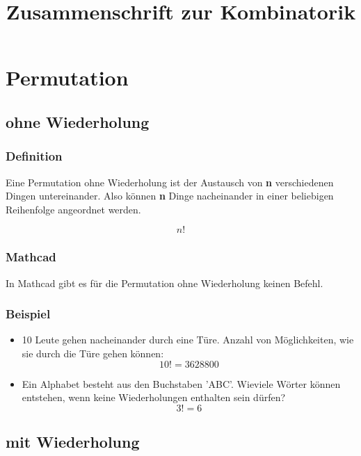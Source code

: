 \documentclass[a4paper,10pt]{article}
\title{Zusammenschrift zur Kombinatorik}
\begin{document}
\maketitle
\thispagestyle{fancy}

\section{Permutation}
\subsection{ohne Wiederholung}
\subsubsection{Definition}
Eine Permutation ohne Wiederholung ist der Austausch von \textbf{n}
verschiedenen Dingen untereinander. Also können \textbf{n} Dinge nacheinander
in einer beliebigen Reihenfolge angeordnet werden.

\begin{equation}
  \label{eq:1}
  n!
\end{equation}

\subsubsection{Mathcad}
In Mathcad gibt es für die Permutation ohne Wiederholung keinen Befehl.

\subsubsection{Beispiel}
\begin{itemize}
\item {
    10 Leute gehen nacheinander durch eine Türe. Anzahl von Möglichkeiten,
    wie sie durch die Türe gehen können:
    \begin{equation}
      \label{eq:3}
      10! = 3628800
    \end{equation}
  }
\item {
    Ein Alphabet besteht aus den Buchstaben 'ABC'. Wieviele Wörter
    können entstehen, wenn keine Wiederholungen enthalten sein dürfen?
    \begin{equation}
      \label{eq:4}
      3! = 6
    \end{equation}
  }
\end{itemize}

\subsection{mit Wiederholung}
\end{document}
